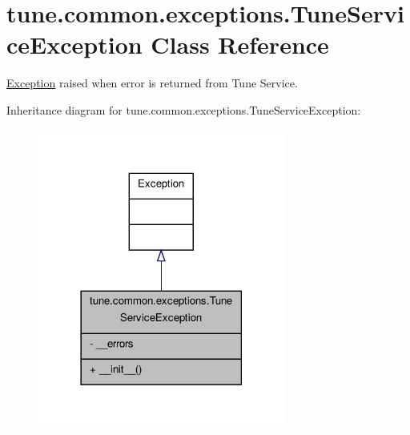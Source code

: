 \hypertarget{classtune_1_1common_1_1exceptions_1_1TuneServiceException}{\section{tune.\-common.\-exceptions.\-Tune\-Service\-Exception Class Reference}
\label{classtune_1_1common_1_1exceptions_1_1TuneServiceException}
}


\hyperlink{classException}{Exception} raised when error is returned from Tune Service.  




Inheritance diagram for tune.\-common.\-exceptions.\-Tune\-Service\-Exception\-:
\nopagebreak
\begin{figure}[H]
\begin{center}
\leavevmode
\includegraphics[width=230pt]{classtune_1_1common_1_1exceptions_1_1TuneServiceException__inherit__graph}
\end{center}
\end{figure}


